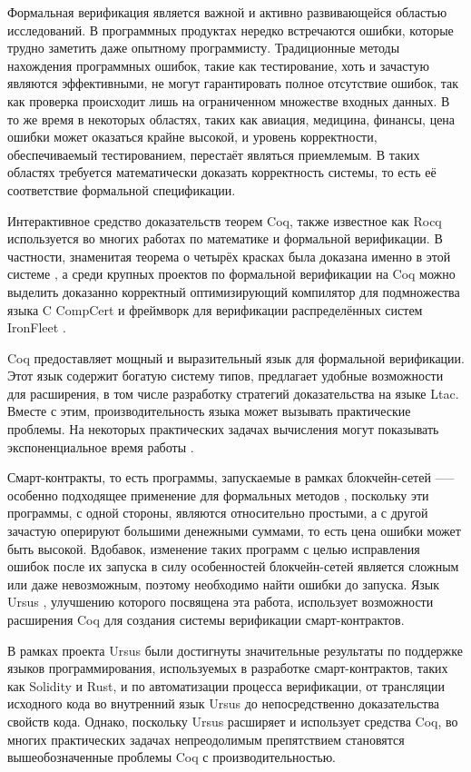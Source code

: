 \documentclass[../thesis.tex]{subfiles}
\begin{document}
 \label{sec:introduction}

Формальная верификация является важной и активно развивающейся областью исследований. В программных продуктах нередко встречаются ошибки, которые трудно заметить даже опытному программисту. Традиционные методы нахождения программных ошибок, такие как тестирование, хоть и зачастую являются эффективными, не могут гарантировать полное отсутствие ошибок, так как проверка происходит лишь на ограниченном множестве входных данных. В то же время в некоторых областях, таких как авиация, медицина, финансы, цена ошибки может оказаться крайне высокой, и уровень корректности, обеспечиваемый тестированием, перестаёт являться приемлемым. В таких областях требуется математически доказать корректность системы, то есть её соответствие формальной спецификации.

Интерактивное средство доказательств теорем Coq, также известное как Rocq \cite{coq} используется во многих работах по математике и формальной верификации. В частности, знаменитая теорема о четырёх красках была доказана именно в этой системе \cite{4colors}, а среди крупных проектов по формальной верификации на Coq можно выделить доказанно корректный оптимизирующий компилятор для подмножества языка C CompCert \cite{compcert} и фреймворк для верификации распределённых систем IronFleet \cite{ironfleet}.

Coq предоставляет мощный и выразительный язык для формальной верификации. Этот язык содержит богатую систему типов, предлагает удобные возможности для расширения, в том числе разработку стратегий доказательства на языке Ltac. Вместе с этим, производительность языка может вызывать практические проблемы. На некоторых практических задачах вычисления могут показывать экспоненциальное время работы \cite{coqslow} \cite{gross_phd}.

Смарт-контракты, то есть программы, запускаемые в рамках блокчейн-сетей —-- особенно подходящее применение для формальных методов \cite{smart_contracts}, поскольку эти программы, с одной стороны, являются относительно простыми, а с другой зачастую оперируют большими денежными суммами, то есть цена ошибки может быть высокой. Вдобавок, изменение таких программ с целью исправления ошибок после их запуска в силу особенностей блокчейн-сетей является сложным или даже невозможным, поэтому необходимо найти ошибки до запуска. Язык Ursus \cite{ursus}, улучшению которого посвящена эта работа, использует возможности расширения Coq для создания системы верификации смарт-контрактов. 

В рамках проекта Ursus были достигнуты значительные результаты по поддержке языков программирования, используемых в разработке смарт-контрактов, таких как Solidity и Rust, и по автоматизации процесса верификации, от трансляции исходного кода во внутренний язык Ursus до непосредственно доказательства свойств кода. Однако, поскольку Ursus расширяет и использует средства Coq, во многих практических задачах непреодолимым препятствием становятся вышеобозначенные проблемы Coq с производительностью.
\end{document}
